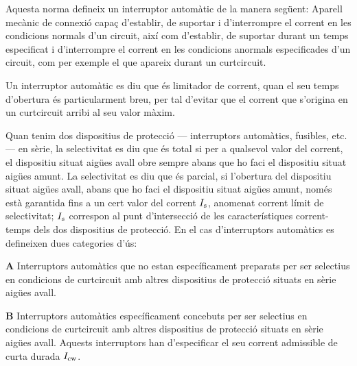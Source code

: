 Aquesta norma defineix un interruptor automàtic de la manera següent: Aparell mecànic de connexió capaç d'establir, de suportar i d'interrompre el corrent en les condicions normals d'un circuit, així com d'establir, de suportar durant un temps especificat i  d'interrompre el corrent en les condicions anormals especificades d'un circuit, com per exemple el que apareix durant un curtcircuit.

Un interruptor automàtic es diu que és limitador de corrent, quan el seu temps d'obertura és particularment breu, per tal d'evitar que el corrent que s'origina en un curtcircuit arribi al seu valor màxim.

Quan tenim dos  dispositius de protecció --- interruptors automàtics, fusibles, etc. --- en sèrie, la selectivitat es diu que és total si per a qualsevol valor del corrent, el dispositiu situat aigües avall obre sempre abans que ho faci el dispositiu situat aigües amunt. La selectivitat es diu que és parcial, si l'obertura del dispositiu situat aigües avall, abans que ho faci el dispositiu situat aigües amunt, només està garantida fins a un cert valor del corrent $I_\mathrm{s}$, anomenat corrent límit de selectivitat; $I_\mathrm{s}$ correspon al punt d'intersecció de les característiques corrent-temps dels dos dispositius de protecció. En el cas d'interruptors automàtics es defineixen dues categories d'ús:
 \begin{list}{}
   {\setlength{\labelwidth}{10mm} \setlength{\leftmargin}{10mm} \setlength{\labelsep}{2mm}}
   \item[\textbf{A}] Interruptors automàtics que no estan específicament preparats per ser selectius en condicions de curtcircuit amb altres dispositius de protecció situats en sèrie  aigües avall.
   \item[\textbf{B}] Interruptors automàtics específicament concebuts per ser selectius en condicions de curtcircuit amb altres dispositius de protecció situats en sèrie  aigües avall. Aquests interruptors han d'especificar el seu corrent admissible de curta durada $I_\mathrm{cw}$.
\end{list}

